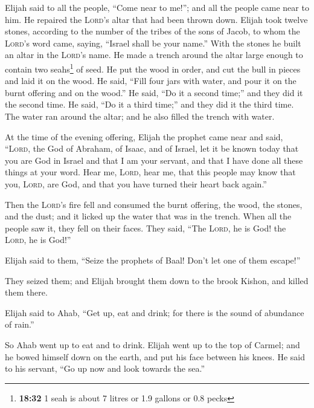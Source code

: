  Elijah said to all the people, ``Come near to me!''; and
all the people came near to him. He repaired the \textsc{Lord}'s altar
that had been thrown down.  Elijah took twelve stones,
according to the number of the tribes of the sons of Jacob, to whom the
\textsc{Lord}'s word came, saying, ``Israel shall be your name.''
 With the stones he built an altar in the \textsc{Lord}'s
name. He made a trench around the altar large enough to contain two
seahs\footnote{\textbf{18:32} 1 seah is about 7 litres or 1.9 gallons or
  0.8 pecks} of seed.  He put the wood in order, and cut
the bull in pieces and laid it on the wood. He said, ``Fill four jars
with water, and pour it on the burnt offering and on the wood.''
 He said, ``Do it a second time;'' and they did it the
second time. He said, ``Do it a third time;'' and they did it the third
time.  The water ran around the altar; and he also filled
the trench with water.

 At the time of the evening offering, Elijah the prophet
came near and said, ``\textsc{Lord}, the God of Abraham, of Isaac, and
of Israel, let it be known today that you are God in Israel and that I
am your servant, and that I have done all these things at your word.
 Hear me, \textsc{Lord}, hear me, that this people may
know that you, \textsc{Lord}, are God, and that you have turned their
heart back again.''

 Then the \textsc{Lord}'s fire fell and consumed the
burnt offering, the wood, the stones, and the dust; and it licked up the
water that was in the trench.  When all the people saw
it, they fell on their faces. They said, ``The \textsc{Lord}, he is God!
the \textsc{Lord}, he is God!''

 Elijah said to them, ``Seize the prophets of Baal! Don't
let one of them escape!''

They seized them; and Elijah brought them down to the brook Kishon, and
killed them there.

 Elijah said to Ahab, ``Get up, eat and drink; for there
is the sound of abundance of rain.''

 So Ahab went up to eat and to drink. Elijah went up to
the top of Carmel; and he bowed himself down on the earth, and put his
face between his knees.  He said to his servant, ``Go up
now and look towards the sea.''

